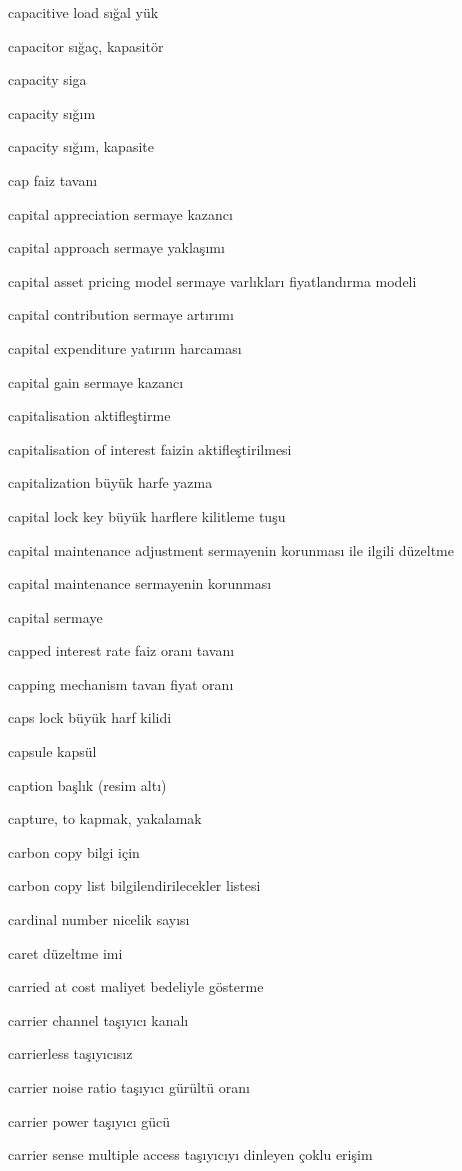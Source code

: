 \documentclass[12pt,fleqn]{article}\usepackage{../../common}
\begin{document}
capacitive load sığal yük

capacitor sığaç, kapasitör

capacity siga

capacity sığım

capacity sığım, kapasite

cap faiz tavanı

capital appreciation sermaye kazancı

capital approach sermaye yaklaşımı

capital asset pricing model sermaye varlıkları fiyatlandırma modeli

capital contribution sermaye artırımı

capital expenditure yatırım harcaması

capital gain sermaye kazancı

capitalisation aktifleştirme

capitalisation of interest faizin aktifleştirilmesi

capitalization büyük harfe yazma

capital lock key büyük harflere kilitleme tuşu

capital maintenance adjustment sermayenin korunması ile ilgili düzeltme

capital maintenance sermayenin korunması

capital sermaye

capped interest rate faiz oranı tavanı

capping mechanism tavan fiyat oranı

caps lock büyük harf kilidi

capsule kapsül

caption başlık (resim altı)

capture, to kapmak, yakalamak

carbon copy bilgi için

carbon copy list bilgilendirilecekler listesi

cardinal number nicelik sayısı

caret düzeltme imi

carried at cost maliyet bedeliyle gösterme

carrier channel taşıyıcı kanalı

carrierless taşıyıcısız

carrier noise ratio taşıyıcı gürültü oranı

carrier power taşıyıcı gücü

carrier sense multiple access taşıyıcıyı dinleyen çoklu erişim
\end{document}
